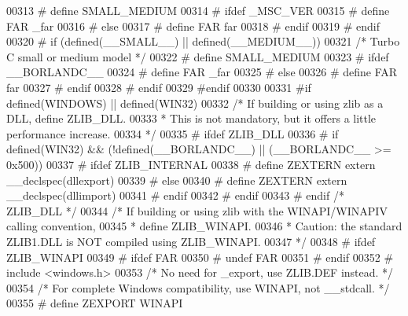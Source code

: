 \begin{DoxyCode}
00313 \textcolor{preprocessor}{#    define SMALL\_MEDIUM}
00314 \textcolor{preprocessor}{#    ifdef \_MSC\_VER}
00315 \textcolor{preprocessor}{#      define FAR \_far}
00316 \textcolor{preprocessor}{#    else}
00317 \textcolor{preprocessor}{#      define FAR far}
00318 \textcolor{preprocessor}{#    endif}
00319 \textcolor{preprocessor}{#  endif}
00320 \textcolor{preprocessor}{#  if (defined(\_\_SMALL\_\_) || defined(\_\_MEDIUM\_\_))}
00321      \textcolor{comment}{/* Turbo C small or medium model */}
00322 \textcolor{preprocessor}{#    define SMALL\_MEDIUM}
00323 \textcolor{preprocessor}{#    ifdef \_\_BORLANDC\_\_}
00324 \textcolor{preprocessor}{#      define FAR \_far}
00325 \textcolor{preprocessor}{#    else}
00326 \textcolor{preprocessor}{#      define FAR far}
00327 \textcolor{preprocessor}{#    endif}
00328 \textcolor{preprocessor}{#  endif}
00329 \textcolor{preprocessor}{#endif}
00330 
00331 \textcolor{preprocessor}{#if defined(WINDOWS) || defined(WIN32)}
00332    \textcolor{comment}{/* If building or using zlib as a DLL, define ZLIB\_DLL.}
00333 \textcolor{comment}{    * This is not mandatory, but it offers a little performance increase.}
00334 \textcolor{comment}{    */}
00335 \textcolor{preprocessor}{#  ifdef ZLIB\_DLL}
00336 \textcolor{preprocessor}{#    if defined(WIN32) && (!defined(\_\_BORLANDC\_\_) || (\_\_BORLANDC\_\_ >= 0x500))}
00337 \textcolor{preprocessor}{#      ifdef ZLIB\_INTERNAL}
00338 \textcolor{preprocessor}{#        define ZEXTERN extern \_\_declspec(dllexport)}
00339 \textcolor{preprocessor}{#      else}
00340 \textcolor{preprocessor}{#        define ZEXTERN extern \_\_declspec(dllimport)}
00341 \textcolor{preprocessor}{#      endif}
00342 \textcolor{preprocessor}{#    endif}
00343 \textcolor{preprocessor}{#  endif  }\textcolor{comment}{/* ZLIB\_DLL */}\textcolor{preprocessor}{}
00344    \textcolor{comment}{/* If building or using zlib with the WINAPI/WINAPIV calling convention,}
00345 \textcolor{comment}{    * define ZLIB\_WINAPI.}
00346 \textcolor{comment}{    * Caution: the standard ZLIB1.DLL is NOT compiled using ZLIB\_WINAPI.}
00347 \textcolor{comment}{    */}
00348 \textcolor{preprocessor}{#  ifdef ZLIB\_WINAPI}
00349 \textcolor{preprocessor}{#    ifdef FAR}
00350 \textcolor{preprocessor}{#      undef FAR}
00351 \textcolor{preprocessor}{#    endif}
00352 \textcolor{preprocessor}{#    include <windows.h>}
00353      \textcolor{comment}{/* No need for \_export, use ZLIB.DEF instead. */}
00354      \textcolor{comment}{/* For complete Windows compatibility, use WINAPI, not \_\_stdcall. */}
00355 \textcolor{preprocessor}{#    define ZEXPORT WINAPI}

\end{DoxyCode}
